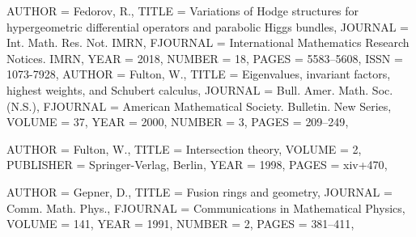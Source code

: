 \begin{bibdiv}
\begin{biblist}
 {
    AUTHOR = {Fedorov, R.},
     TITLE = {Variations of {H}odge structures for hypergeometric
              differential operators and parabolic {H}iggs bundles},
   JOURNAL = {Int. Math. Res. Not. IMRN},
  FJOURNAL = {International Mathematics Research Notices. IMRN},
      YEAR = {2018},
    NUMBER = {18},
     PAGES = {5583--5608},
      ISSN = {1073-7928},
}
 {
    AUTHOR = {Fulton, W.},
     TITLE = {Eigenvalues, invariant factors, highest weights, and
              {S}chubert calculus},
   JOURNAL = {Bull. Amer. Math. Soc. (N.S.)},
  FJOURNAL = {American Mathematical Society. Bulletin. New Series},
    VOLUME = {37},
      YEAR = {2000},
    NUMBER = {3},
     PAGES = {209--249},
}



 {
    AUTHOR = {Fulton, W.},
     TITLE = {Intersection theory},
    VOLUME = {2},
 PUBLISHER = {Springer-Verlag, Berlin},
      YEAR = {1998},
     PAGES = {xiv+470},
}



 {
    AUTHOR = {Gepner, D.},
     TITLE = {Fusion rings and geometry},
   JOURNAL = {Comm. Math. Phys.},
  FJOURNAL = {Communications in Mathematical Physics},
    VOLUME = {141},
      YEAR = {1991},
    NUMBER = {2},
     PAGES = {381--411},
}


\end{biblist}
\end{bibdiv}
